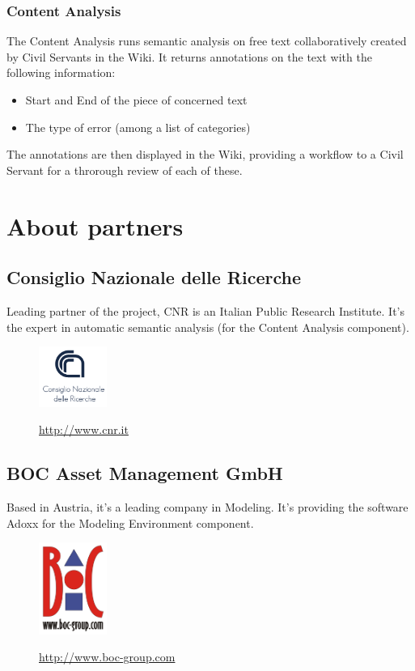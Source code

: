 \documentclass{learnpad}
\begin{document}
\subsection{Content Analysis}
The Content Analysis runs semantic analysis on free text collaboratively created
by Civil Servants in the Wiki.  It returns annotations on the text with the
following information:
\begin{itemize}
	\item Start and End of the piece of concerned text
	\item The type of error (among a list of categories)
\end{itemize}

The annotations are then displayed in the Wiki, providing a workflow to a Civil
Servant for a throrough review of each of these.

\chapter{About partners}
\label{ch:partners}

\section{Consiglio Nazionale delle Ricerche}
Leading partner of the \learnpad project, CNR is an Italian Public Research
Institute.  It's the expert in automatic semantic analysis (for the Content
Analysis component).

\begin{figure}[!htp]
	\centering
	\includegraphics[width=6em,keepaspectratio]{figures/cnr.png}\par
	\url{http://www.cnr.it}
\end{figure}

\section{BOC Asset Management GmbH}
Based in Austria, it's a leading company in Modeling.  It's providing the
software Adoxx for the Modeling Environment component.

\begin{figure}[!htp]
	\centering
	\includegraphics[width=6em,keepaspectratio]{figures/boc-group.png}\par
	\url{http://www.boc-group.com}
\end{figure}
\end{document}
